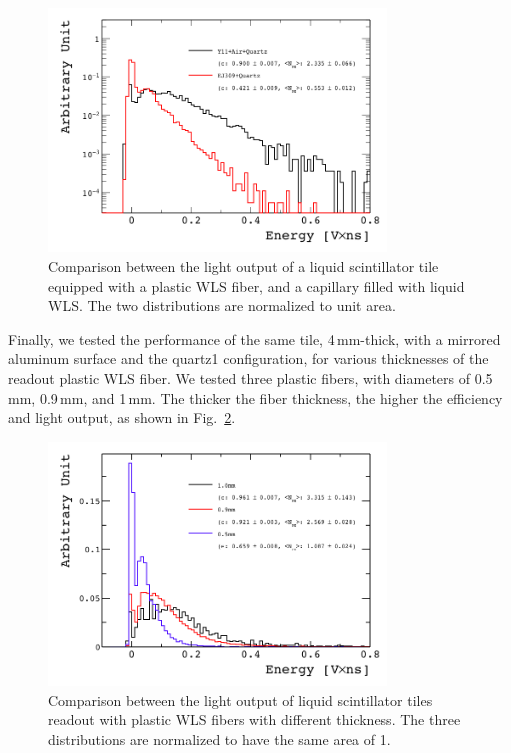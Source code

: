 \documentclass[review]{elsarticle}
\begin{document}
\begin{figure}[!ht]
\begin{center}
\includegraphics[width=0.8\textwidth]{./figures/list_RO_FIBER_all_norm.png}
\caption{Comparison between the light output of a liquid scintillator
  tile equipped with a plastic WLS fiber, and a capillary filled with
  liquid WLS. The two distributions are normalized to unit area.}
\label{fig:y11_vs_cap}
\end{center}
\end{figure}




Finally, we tested the performance of the same tile, 4\,mm-thick, with a
mirrored aluminum surface and the quartz1 configuration,
for various thicknesses of the
readout plastic WLS fiber. We tested three plastic fibers, with 
diameters of 0.5\,mm, 0.9\,mm, and 1\,mm. The thicker the
fiber thickness, the higher the efficiency and light output, as shown
in Fig.~\ref{fig:fiber_thickness_comp}.

\begin{figure}[!ht]
\begin{center}
\includegraphics[width=0.8\textwidth]{./figures/list_Fiber_Thickness_all_1.png}
\caption{Comparison between the light output of liquid scintillator
  tiles readout with plastic WLS fibers with different thickness. The
  three distributions are normalized to have the same area of 1.}
\label{fig:fiber_thickness_comp}
\end{center}
\end{figure}
\end{document}
